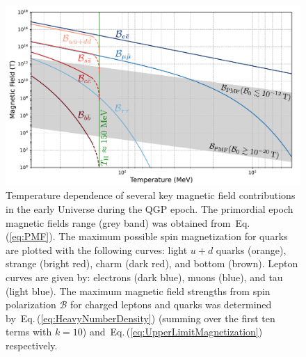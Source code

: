 \documentclass[epjST]{svjour}
\newcommand{\req}[1]{Eq.\,(\ref{#1})}
\begin{document}
\begin{figure}%
\centerline{
\includegraphics[width=0.90\columnwidth]{Figure_1_v3.pdf}}
\caption{\label{Figure_1}Temperature dependence of several key magnetic field contributions in the early Universe during the QGP epoch. {\color{blue}The primordial epoch magnetic fields range (grey band) was obtained from~\req{eq:PMF}. The maximum possible spin magnetization for quarks are plotted with the following curves: light \(u+d\) quarks (orange), strange (bright red), charm (dark red), and bottom (brown). Lepton curves are given by: electrons (dark blue), muons (blue), and tau (light blue). The maximum magnetic field strengths from spin polarization \(\mathcal{B}\) for charged leptons and quarks was determined by~\req{eq:HeavyNumberDensity} (summing over the first ten terms with \(k=10\)) and~\req{eq:UpperLimitMagnetization} respectively.}}
\end{figure}
\end{document}
